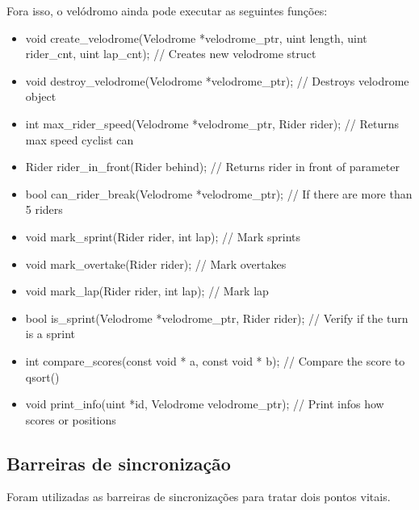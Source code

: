 \documentclass[12pt,a4paper]{article}
\begin{document}
    
    Fora isso, o velódromo ainda pode executar as seguintes funções:
    
    
    \begin{itemize}
    \item void create\_velodrome(Velodrome *velodrome\_ptr, uint length, uint                   rider\_cnt, uint lap\_cnt); // Creates new velodrome struct
    \item void destroy\_velodrome(Velodrome *velodrome\_ptr); // Destroys velodrome             object
    \item int max\_rider\_speed(Velodrome *velodrome\_ptr, Rider rider); // Returns max         speed cyclist can
    \item Rider rider\_in\_front(Rider behind); // Returns rider in front of parameter
    \item bool can\_rider\_break(Velodrome *velodrome\_ptr); // If there are more than          5 riders
    \item void mark\_sprint(Rider rider, int lap); // Mark sprints
    \item void mark\_overtake(Rider rider); // Mark overtakes
    \item void mark\_lap(Rider rider, int lap); // Mark lap
    \item bool is\_sprint(Velodrome *velodrome\_ptr, Rider rider); // Verify if the             turn is a sprint
    \item int compare\_scores(const void * a, const void * b); // Compare the score to          qsort()
    \item void print\_info(uint *id, Velodrome velodrome\_ptr); // Print infos how              scores or positions
    \end{itemize}

    

\subsection{Barreiras de sincronização}

    Foram utilizadas as barreiras de sincronizações para tratar dois pontos vitais. 
    
\end{document}
